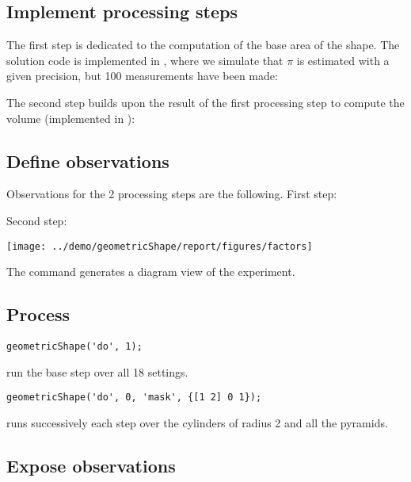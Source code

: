\subsection{Implement processing steps}

The first step is dedicated to the computation of the base area of the shape. The solution code is implemented in , where we simulate that $\pi$ is estimated with a given precision, but 100 measurements have been made:



The second step builds upon the result of the first processing step to compute the volume (implemented in ):


\subsection{Define observations}

Observations for the 2 processing steps are the following. First step:

Second step:


\begin{marginfigure}
\texttt{[image: ../demo/geometricShape/report/figures/factors]}
\end{marginfigure}

The command  generates a diagram view of the experiment.

\subsection{Process}

\begin{lstlisting}
geometricShape('do', 1);
\end{lstlisting}
run the base step over all 18 settings.
\begin{lstlisting}
geometricShape('do', 0, 'mask', {[1 2] 0 1});
\end{lstlisting}
runs successively each step over the cylinders of radius 2 and all the pyramids.

\subsection{Expose observations}

